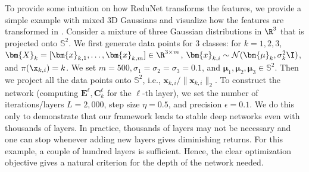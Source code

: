\documentclass[../../book-main.tex]{subfiles}
\begin{document}
\begin{example}
    To provide some intuition on how ReduNet transforms the features,
    we provide a simple example with mixed 3D Gaussians and visualize
    how the features are transformed in .
    Consider a mixture of three Gaussian distributions in $\R^{3}$
    that is projected onto $\mathbb{S}^2$. We first generate data
    points for 3 classes: for $k=1,2,3$, $\bm{X}_{k}=[\bm{x}_{k,1},
    \ldots, \bm{x}_{k,m}] \in \R^{3\times m}$, $\bm{x}_{k,i} \sim
    \mathcal{N}(\bm{\mu}_{k}, \sigma_{k}^{2} \I)$, and ${\pi}(\x_{k,i}) = k$.
    We set $m=500, \sigma_{1}=\sigma_{2}=\sigma_{3}=0.1$, and
    $\bm{\mu}_{1}, \bm{\mu}_{2}, \bm{\mu}_{3} \in \mathbb{S}^2$.
    Then we project all the data points onto $\mathbb{S}^{2}$, i.e.,
    $\bm{x}_{k,i}/\|\bm{x}_{k,i}\|_{2}$.
    To construct the network (computing $\bm{E}^{\ell},
    \bm{C}^{\ell}_{k}$ for the $\ell$-th layer), we set the number of
    iterations/layers $L=2,000$, step size $\eta=0.5$, and precision
    $\epsilon=0.1$.
    We do this only to demonstrate that our framework leads to stable
    deep networks even with thousands of layers.
    In practice, thousands of layers may not be necessary and one can
    stop whenever adding new layers gives diminishing returns.
    For this example, a couple of hundred layers is sufficient.
    Hence, the clear optimization objective gives a natural criterion
    for the depth of the network needed.


\end{example}
\end{document}
